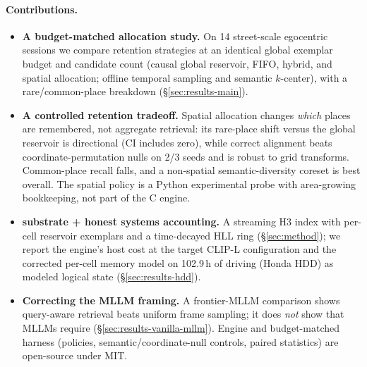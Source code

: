 \paragraph{Contributions.}
\begin{itemize}
  \item \textbf{A budget-matched allocation study.} On 14 street-scale
    egocentric sessions we compare retention strategies at an identical global
    exemplar budget and candidate count (causal global reservoir, FIFO, hybrid,
    and spatial allocation; offline temporal sampling and semantic $k$-center), with
    a rare/common-place breakdown (\S\ref{sec:results-main}).
  \item \textbf{A controlled retention tradeoff.} Spatial allocation changes
    \emph{which} places are remembered, not aggregate retrieval: its rare-place
    shift versus the global reservoir is directional (CI includes zero), while
    correct alignment beats coordinate-permutation nulls on 2/3 seeds and is
    robust to grid transforms. Common-place recall falls, and a non-spatial
    semantic-diversity coreset is best overall. The spatial policy is a Python
    experimental probe with area-growing bookkeeping, not part of the C engine.
  \item \textbf{\psm{} substrate + honest systems accounting.} A streaming H3
    index with per-cell reservoir exemplars and a time-decayed HLL ring
    (\S\ref{sec:method}); we report the engine's host cost at the target CLIP-L
    configuration and the corrected per-cell memory model on
    102.9\,h of driving (Honda HDD) as modeled logical state
    (\S\ref{sec:results-hdd}).
  \item \textbf{Correcting the MLLM framing.} A frontier-MLLM comparison shows
    query-aware retrieval beats uniform frame sampling; it does \emph{not} show
    that MLLMs require \psm{} (\S\ref{sec:results-vanilla-mllm}). Engine and
    budget-matched harness (policies, semantic/coordinate-null controls, paired
    statistics) are open-source under MIT.
\end{itemize}
